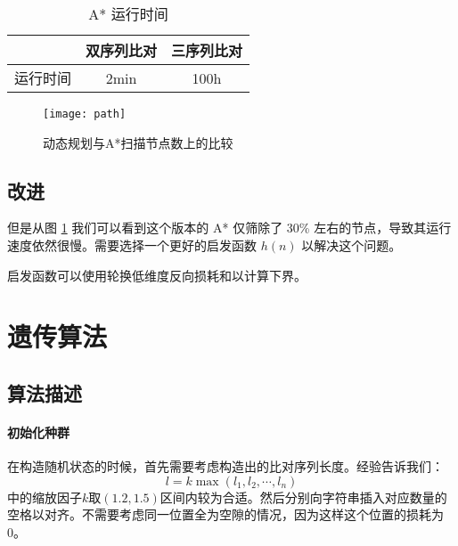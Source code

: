     \begin{minipage}{0.5\textwidth}
        \begin{table}[H]
            \centering
            \caption{A* 运行时间}\label{tab:astar}
            \begin{tabular}{ccc}
                \toprule
                 & 双序列比对 & 三序列比对 \\
                \midrule
                运行时间 & 2min & 100h \\
                \bottomrule
            \end{tabular}
        \end{table}
    \end{minipage}
    \begin{minipage}{0.5\textwidth}
        \begin{figure}[H]
            \centering
            \texttt{[image: path]}
            \caption{动态规划与A*扫描节点数上的比较}\label{fig:path}
        \end{figure}
    \end{minipage}

    \subsection{改进}

    但是从图 \ref{fig:path} 我们可以看到这个版本的 A* 仅筛除了 30\% 左右的节点，导致其运行速度依然很慢。需要选择一个更好的启发函数 $h(n)$ 以解决这个问题。

    启发函数可以使用轮换低维度反向损耗和以计算下界\cite{hastar}。

    \section{遗传算法}

    \subsection{算法描述}
    

    \paragraph{初始化种群} 在构造随机状态的时候，首先需要考虑构造出的比对序列长度。经验\cite{simplega}告诉我们：
    \begin{equation*}
         l = k\max{(l_1,l_2,\cdots,l_n)}
    \end{equation*}
    中的缩放因子$k$取$(1.2,1.5)$区间内较为合适。然后分别向字符串插入对应数量的空格以对齐。不需要考虑同一位置全为空隙的情况，因为这样这个位置的损耗为 0。

